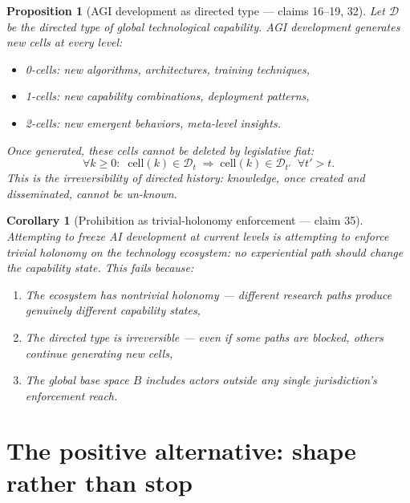 \documentclass[11pt,a4paper]{article}
\newtheorem{proposition}[definition]{Proposition}
\newtheorem{corollary}[definition]{Corollary}
\begin{document}
\begin{proposition}[AGI development as directed type --- claims 16--19, 32]
\label{prop:directed}
Let $\mathcal{D}$ be the directed type of global technological capability.
AGI development generates new cells at every level:
\begin{itemize}
\item 0-cells: new algorithms, architectures, training techniques,
\item 1-cells: new capability combinations, deployment patterns,
\item 2-cells: new emergent behaviors, meta-level insights.
\end{itemize}
Once generated, these cells cannot be deleted by legislative fiat:
\[
  \forall k \geq 0: \;\; \text{cell}(k) \in \mathcal{D}_t
  \;\Rightarrow\; \text{cell}(k) \in \mathcal{D}_{t'} \;\;\forall t' > t.
\]
This is the irreversibility of directed history: knowledge, once created
and disseminated, cannot be un-known.
\end{proposition}

\begin{corollary}[Prohibition as trivial-holonomy enforcement --- claim 35]
Attempting to freeze AI development at current levels is attempting to
enforce trivial holonomy on the technology ecosystem: no experiential
path should change the capability state. This fails because:
\begin{enumerate}
\item The ecosystem has nontrivial holonomy --- different research paths
  produce genuinely different capability states,
\item The directed type is irreversible --- even if some paths are blocked,
  others continue generating new cells,
\item The global base space $B$ includes actors outside any single
  jurisdiction's enforcement reach.
\end{enumerate}
\end{corollary}

\section{The positive alternative: shape rather than stop}
\label{sec:positive}
\end{document}
